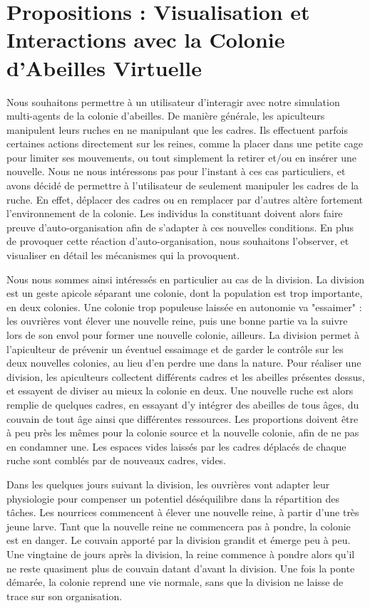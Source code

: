 \chapter{Propositions : Visualisation et Interactions avec la Colonie d'Abeilles Virtuelle}
\label{ChapitrePropVR}

		Nous souhaitons permettre à un utilisateur d'interagir avec notre simulation multi-agents de la colonie d'abeilles. De manière générale, les apiculteurs manipulent leurs ruches en ne manipulant que les cadres. Ils effectuent parfois certaines actions directement sur les reines, comme la placer dans une petite cage pour limiter ses mouvements, ou tout simplement la retirer et/ou en insérer une nouvelle. Nous ne nous intéressons pas pour l'instant à ces cas particuliers, et avons décidé de permettre à l'utilisateur de seulement manipuler les cadres de la ruche. En effet, déplacer des cadres ou en remplacer par d'autres altère fortement l'environnement de la colonie. Les individus la constituant doivent alors faire preuve d'auto-organisation afin de s'adapter à ces nouvelles conditions. En plus de provoquer cette réaction d'auto-organisation, nous souhaitons l'observer, et visualiser en détail les mécanismes qui la provoquent.
		
		Nous nous sommes ainsi intéressés en particulier au cas de la division. La division est un geste apicole séparant une colonie, dont la population est trop importante, en deux colonies. Une colonie trop populeuse laissée en autonomie va "essaimer" : les ouvrières vont élever une nouvelle reine, puis une bonne partie va la suivre lors de son envol pour former une nouvelle colonie, ailleurs. La division permet à l'apiculteur de prévenir un éventuel essaimage et de garder le contrôle sur les deux nouvelles colonies, au lieu d'en perdre une dans la nature. Pour réaliser une division, les apiculteurs collectent différents cadres et les abeilles présentes dessus, et essayent de diviser au mieux la colonie en deux. Une nouvelle ruche est alors remplie de quelques cadres, en essayant d'y intégrer des abeilles de tous âges, du couvain de tout âge ainsi que différentes ressources. Les proportions doivent être à peu près les mêmes pour la colonie source et la nouvelle colonie, afin de ne pas en condamner une. Les espaces vides laissés par les cadres déplacés de chaque ruche sont comblés par de nouveaux cadres, vides.
		
		Dans les quelques jours suivant la division, les ouvrières vont adapter leur physiologie pour compenser un potentiel déséquilibre dans la répartition des tâches. Les nourrices commencent à élever une nouvelle reine, à partir d'une très jeune larve. Tant que la nouvelle reine ne commencera pas à pondre, la colonie est en danger. Le couvain apporté par la division grandit et émerge peu à peu. Une vingtaine de jours après la division, la reine commence à pondre alors qu'il ne reste quasiment plus de couvain datant d'avant la division. Une fois la ponte démarée, la colonie reprend une vie normale, sans que la division ne laisse de trace sur son organisation.
		
